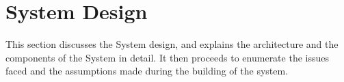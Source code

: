 \section{System Design}
This section discusses the System design, and explains the architecture and the components of the System in detail. It then proceeds to enumerate the issues faced and the assumptions made during the building of the system. 



%
%
